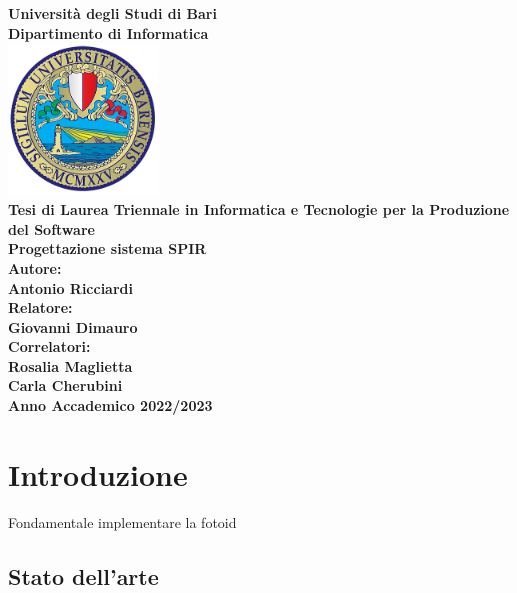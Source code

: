 \documentclass[a4paper,12pt]{report}
\begin{document}

\begin{titlepage}
\centering

\textbf{\large Università degli Studi di Bari} \\
\vspace{0.5cm}
\textbf{\large Dipartimento di Informatica} \\
\vspace{2cm}
\includegraphics[width=40mm,scale=0.5]{assets/images/logo.png} \\
\vspace{2cm}
\textbf{\large Tesi di Laurea Triennale in Informatica e Tecnologie per la Produzione del Software} \\
\vspace{1cm}
\textbf{\LARGE Progettazione sistema SPIR} \\
\vspace{1cm}
\textbf{\large Autore:} \\
\textbf{Antonio Ricciardi} \\
\vspace{0.3cm}
\textbf{\large Relatore:} \\
\textbf{Giovanni Dimauro} \\
\vspace{0.3cm}
\textbf{\large Correlatori:} \\
\textbf{Rosalia Maglietta} \\
\textbf{Carla Cherubini} \\
\vfill
\textbf{\large Anno Accademico 2022/2023} %
    
\end{titlepage}

\tableofcontents
\chapter{Introduzione}
  Fondamentale implementare la fotoid
  \section{Stato dell'arte}
\end{document}
